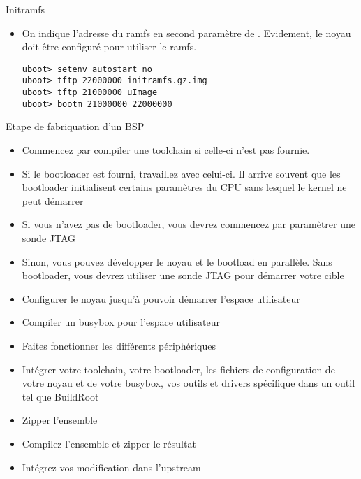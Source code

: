 \begin{frame}[fragile=singleslide]{Initramfs}
  \begin{itemize} 
  \item  On  indique  l'adresse   du  ramfs  en  second  paramètre  de
    . Evidement, le noyau doit être configuré pour utiliser
    le ramfs.
    \begin{lstlisting} 
uboot> setenv autostart no
uboot> tftp 22000000 initramfs.gz.img 
uboot> tftp 21000000 uImage 
uboot> bootm 21000000 22000000 
    \end{lstlisting}
  \end{itemize}
\end{frame}


\begin{frame}[fragile=singleslide]{Etape de fabriquation d'un BSP}
  \begin{itemize}
  \item  Commencez par compiler  une toolchain  si celle-ci  n'est pas
    fournie.
  \item  Si le  bootloader est  fourni, travaillez  avec  celui-ci. Il
    arrive souvent que les bootloader initialisent certains paramètres
    du CPU sans lesquel le kernel ne peut démarrer
  \item Si  vous n'avez pas  de bootloader, vous devrez  commencez par
    paramètrer une sonde JTAG
  \item  Sinon, vous  pouvez développer  le  noyau et  le bootload  en
    parallèle. Sans  bootloader, vous  devrez utiliser une  sonde JTAG
    pour démarrer votre cible
  \item  Configurer   le  noyau  jusqu'à   pouvoir  démarrer  l'espace
    utilisateur
  \item Compiler un busybox pour l'espace utilisateur
  \item Faites fonctionner les différents périphériques
  \item Intégrer  votre toolchain,  votre bootloader, les  fichiers de
    configuration de  votre noyau et  de votre busybox, vos  outils et
    drivers spécifique dans un outil tel que BuildRoot
  \item Zipper l'ensemble
  \item Compilez l'ensemble et zipper le résultat
  \item Intégrez vos modification dans l'upstream
  \end{itemize}
\end{frame} 




